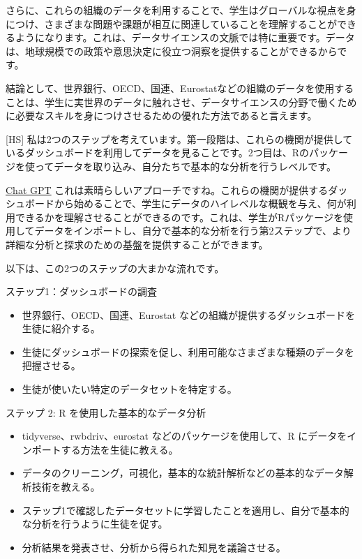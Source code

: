 \documentclass[
]{book}
\providecommand{\tightlist}{%
  \setlength{\itemsep}{0pt}\setlength{\parskip}{0pt}}
\theoremstyle{definition}
\theoremstyle{definition}
\theoremstyle{definition}
\theoremstyle{definition}
\theoremstyle{remark}
\begin{document}
さらに、これらの組織のデータを利用することで、学生はグローバルな視点を身につけ、さまざまな問題や課題が相互に関連していることを理解することができるようになります。これは、データサイエンスの文脈では特に重要です。データは、地球規模での政策や意思決定に役立つ洞察を提供することができるからです。

結論として、世界銀行、OECD、国連、Eurostatなどの組織のデータを使用することは、学生に実世界のデータに触れさせ、データサイエンスの分野で働くために必要なスキルを身につけさせるための優れた方法であると言えます。

{[}HS{]} 私は2つのステップを考えています。第一段階は、これらの機関が提供しているダッシュボードを利用してデータを見ることです。2つ目は、Rのパッケージを使ってデータを取り込み、自分たちで基本的な分析を行うレベルです。

\protect\hyperlink{chatgpt}{Chat GPT} これは素晴らしいアプローチですね。これらの機関が提供するダッシュボードから始めることで、学生にデータのハイレベルな概観を与え、何が利用できるかを理解させることができるのです。これは、学生がRパッケージを使用してデータをインポートし、自分で基本的な分析を行う第2ステップで、より詳細な分析と探求のための基盤を提供することができます。

以下は、この2つのステップの大まかな流れです。

ステップ1：ダッシュボードの調査

\begin{itemize}
\tightlist
\item
  世界銀行、OECD、国連、Eurostat などの組織が提供するダッシュボードを生徒に紹介する。
\item
  生徒にダッシュボードの探索を促し、利用可能なさまざまな種類のデータを把握させる。
\item
  生徒が使いたい特定のデータセットを特定する。
\end{itemize}

ステップ 2: R を使用した基本的なデータ分析

\begin{itemize}
\tightlist
\item
  tidyverse、rwbdriv、eurostat などのパッケージを使用して、R にデータをインポートする方法を生徒に教える。
\item
  データのクリーニング，可視化，基本的な統計解析などの基本的なデータ解析技術を教える。
\item
  ステップ1で確認したデータセットに学習したことを適用し、自分で基本的な分析を行うように生徒を促す。
\item
  分析結果を発表させ、分析から得られた知見を議論させる。
\end{itemize}
\end{document}
